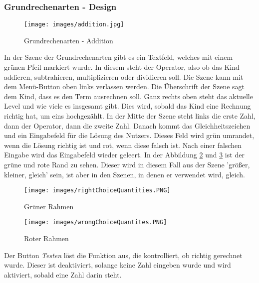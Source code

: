 \subsubsection{Grundrechenarten - Design}
\begin{figure}[htbp]
  \centering
  \texttt{[image: images/addition.jpg]}
  \caption{Grundrechenarten - Addition}
  \label{basicOperation}
\end{figure}
In der Szene der Grundrechenarten gibt es ein Textfeld, welches mit einem grünen Pfeil markiert wurde. In diesem steht der Operator, also ob das Kind addieren, subtrahieren, multiplizieren oder dividieren soll. Die Szene kann mit dem Menü-Button oben links verlassen werden. Die Überschrift der Szene sagt dem Kind, dass es den Term ausrechnen soll. Ganz rechts oben steht das aktuelle Level und wie viele es insgesamt gibt. Dies wird, sobald das Kind eine Rechnung richtig hat, um eins hochgezählt. In der Mitte der Szene steht links die erste Zahl, dann der Operator, dann die zweite Zahl. Danach kommt das Gleichheitszeichen und ein Eingabefeld für die Lösung des Nutzers. Dieses Feld wird grün umrandet, wenn die Lösung richtig ist und rot, wenn diese falsch ist. Nach einer falschen Eingabe wird das Eingabefeld wieder geleert. In der Abbildung \ref{greenBorder} und \ref{redBorder} ist der grüne und rote Rand zu sehen. Dieser wird in diesem Fall aus der Szene 'größer, kleiner, gleich' sein, ist aber in den Szenen, in denen er verwendet wird, gleich. 
\begin{figure}[htbp]
  \centering
  \texttt{[image: images/rightChoiceQuantities.PNG]}
  \caption{Grüner Rahmen}
  \label{greenBorder}
\end{figure}
\begin{figure}[htbp]
  \centering
  \texttt{[image: images/wrongChoiceQuantites.PNG]}
  \caption{Roter Rahmen}
  \label{redBorder}
\end{figure}
Der Button \textit{Testen} löst die Funktion aus, die kontrolliert, ob richtig gerechnet wurde. Dieser ist deaktiviert, solange keine Zahl eingeben wurde und wird aktiviert, sobald eine Zahl darin steht.
